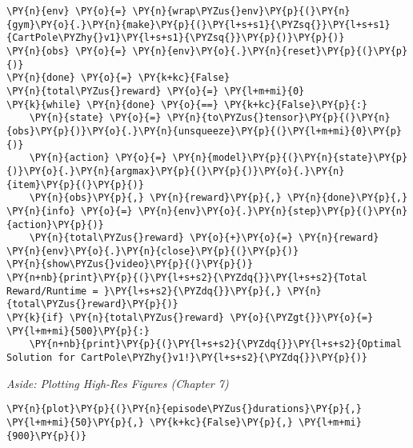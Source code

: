     \begin{tcolorbox}[breakable, size=fbox, boxrule=1pt, pad at break*=1mm,colback=cellbackground, colframe=cellborder]
\begin{Verbatim}[commandchars=\\\{\}]
\PY{n}{env} \PY{o}{=} \PY{n}{wrap\PYZus{}env}\PY{p}{(}\PY{n}{gym}\PY{o}{.}\PY{n}{make}\PY{p}{(}\PY{l+s+s1}{\PYZsq{}}\PY{l+s+s1}{CartPole\PYZhy{}v1}\PY{l+s+s1}{\PYZsq{}}\PY{p}{)}\PY{p}{)}
\PY{n}{obs} \PY{o}{=} \PY{n}{env}\PY{o}{.}\PY{n}{reset}\PY{p}{(}\PY{p}{)}
\PY{n}{done} \PY{o}{=} \PY{k+kc}{False}
\PY{n}{total\PYZus{}reward} \PY{o}{=} \PY{l+m+mi}{0}
\PY{k}{while} \PY{n}{done} \PY{o}{==} \PY{k+kc}{False}\PY{p}{:}
    \PY{n}{state} \PY{o}{=} \PY{n}{to\PYZus{}tensor}\PY{p}{(}\PY{n}{obs}\PY{p}{)}\PY{o}{.}\PY{n}{unsqueeze}\PY{p}{(}\PY{l+m+mi}{0}\PY{p}{)}
    \PY{n}{action} \PY{o}{=} \PY{n}{model}\PY{p}{(}\PY{n}{state}\PY{p}{)}\PY{o}{.}\PY{n}{argmax}\PY{p}{(}\PY{p}{)}\PY{o}{.}\PY{n}{item}\PY{p}{(}\PY{p}{)}
    \PY{n}{obs}\PY{p}{,} \PY{n}{reward}\PY{p}{,} \PY{n}{done}\PY{p}{,} \PY{n}{info} \PY{o}{=} \PY{n}{env}\PY{o}{.}\PY{n}{step}\PY{p}{(}\PY{n}{action}\PY{p}{)}
    \PY{n}{total\PYZus{}reward} \PY{o}{+}\PY{o}{=} \PY{n}{reward}
\PY{n}{env}\PY{o}{.}\PY{n}{close}\PY{p}{(}\PY{p}{)}
\PY{n}{show\PYZus{}video}\PY{p}{(}\PY{p}{)}
\PY{n+nb}{print}\PY{p}{(}\PY{l+s+s2}{\PYZdq{}}\PY{l+s+s2}{Total Reward/Runtime = }\PY{l+s+s2}{\PYZdq{}}\PY{p}{,} \PY{n}{total\PYZus{}reward}\PY{p}{)}
\PY{k}{if} \PY{n}{total\PYZus{}reward} \PY{o}{\PYZgt{}}\PY{o}{=} \PY{l+m+mi}{500}\PY{p}{:}
    \PY{n+nb}{print}\PY{p}{(}\PY{l+s+s2}{\PYZdq{}}\PY{l+s+s2}{Optimal Solution for CartPole\PYZhy{}v1!}\PY{l+s+s2}{\PYZdq{}}\PY{p}{)}
\end{Verbatim}
\end{tcolorbox}

    \emph{Aside: Plotting High-Res Figures (Chapter 7)}

    \begin{tcolorbox}[breakable, size=fbox, boxrule=1pt, pad at break*=1mm,colback=cellbackground, colframe=cellborder]
\begin{Verbatim}[commandchars=\\\{\}]
\PY{n}{plot}\PY{p}{(}\PY{n}{episode\PYZus{}durations}\PY{p}{,} \PY{l+m+mi}{50}\PY{p}{,} \PY{k+kc}{False}\PY{p}{,} \PY{l+m+mi}{900}\PY{p}{)}
\end{Verbatim}
\end{tcolorbox}
